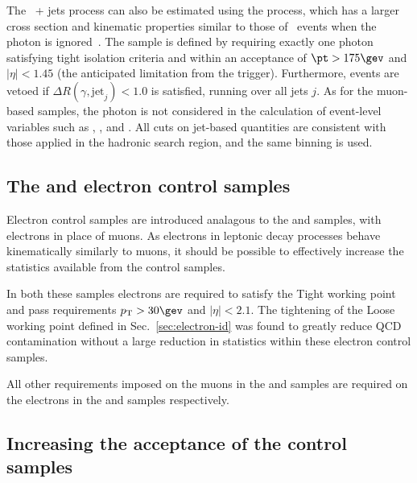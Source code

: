 The \znunu\ + jets process can also be estimated using the \gj
process, which has a larger cross section and kinematic properties
similar to those of \znunu\ events when the photon is
ignored~\cite{PAS-SUS-08-002,Bern:2011pa}. The \gj sample is defined
by requiring exactly one photon satisfying tight isolation criteria
and within an acceptance of $\pt > 175\gev$ and $|\eta| <
1.45$ (the anticipated limitation from the trigger). Furthermore, events are vetoed if $\Delta
R(\gamma,\textrm{jet}_j) < 1.0$ is satisfied, running over all jets
$j$. As for the muon-based samples, the photon is not considered in
the calculation of event-level variables such as \scalht, \mht, \met and 
\alphat. All cuts on jet-based quantities are consistent with those
applied in the hadronic search region, and the same \HT binning is
used. 

\subsection{The \ej and \eej electron control samples}

Electron control samples are introduced analagous
to the \mj and \mmj samples, with electrons in place of muons. As electrons 
in leptonic decay processes behave kinematically similarly
to muons, it should be possible to effectively increase the statistics available
from the control samples. 

In both these samples electrons are required to satisfy the Tight working point
and pass requirements $\Pt> 30\gev$ and $|\eta| < 2.1$. The tightening of the
Loose working point defined in Sec.~\ref{sec:electron-id} was found to 
greatly reduce QCD contamination without a large reduction in statistics 
within these electron control samples.

All other requirements imposed on the muons in the \mj and \mmj samples are 
required on the electrons in the \ej and \eej samples respectively.

\subsection{Increasing the acceptance of the control samples\label{sec:larger}}

